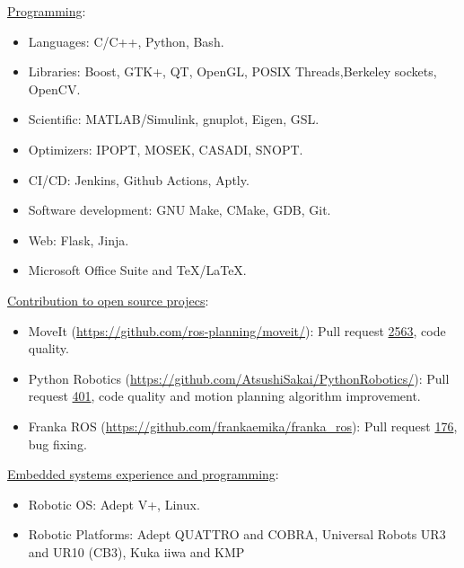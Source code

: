 \addskill%
{%
    \underline{Programming}:%
    \begin{itemize}[nosep, rightmargin=0cm]%
        \item Languages: C/C++, Python, Bash.%
        \item Libraries: Boost, GTK+, QT, OpenGL, POSIX Threads,Berkeley sockets, \\OpenCV.%
        \item Scientific: MATLAB/Simulink, gnuplot, Eigen, GSL.%
        \item Optimizers: IPOPT, MOSEK, CASADI, SNOPT.%
        \item CI/CD: Jenkins, Github Actions, Aptly.%
        \item Software development: GNU Make, CMake, GDB, Git.%
        \item Web: Flask, Jinja.%
        \item Microsoft Office Suite and TeX/LaTeX.%
    \end{itemize}%
}%
\addskill%
{%
    \underline{Contribution to open source projecs}:%
    \begin{itemize}[nosep, rightmargin=0cm]%
        \item MoveIt (\url{https://github.com/ros-planning/moveit/}): Pull request \href{https://github.com/ros-planning/moveit/pull/2563}{2563}, code quality.
        \item Python Robotics (\url{https://github.com/AtsushiSakai/PythonRobotics/}): Pull request  \href{https://github.com/AtsushiSakai/PythonRobotics/pull/401}{401}, code quality and motion planning algorithm improvement.
        \item Franka ROS (\url{https://github.com/frankaemika/franka_ros}): Pull request \href{https://github.com/frankaemika/franka_ros/pull/176}{176}, bug fixing.
    \end{itemize}%
}%
\addskill%
{%
    \underline{Embedded systems experience and programming}:%
    \begin{itemize}[nosep, rightmargin=0cm]%
        \item Robotic OS: Adept V+, Linux.%
        \item Robotic Platforms: Adept QUATTRO and COBRA, Universal Robots UR3 and UR10 (CB3), Kuka iiwa and KMP%
    \end{itemize}%
}%

